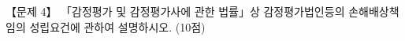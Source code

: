 \begin{longquestion}{【문제 4】}
「감정평가 및 감정평가사에 관한 법률」상 감정평가법인등의 손해배상책임의 성립요건에 관하여 설명하시오. (10점) \par
\end{longquestion}
